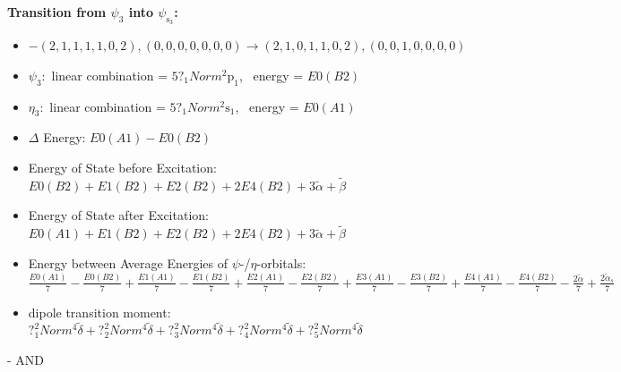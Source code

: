 \documentclass[12pt,a4paper]{article}
\begin{document}
        \noindent\textbf{Transition from $\psi_{3}$ into $\psi_{\text{s}_{3}}$:}
        \begin{itemize}
            \item $- (2, 1, 1, 1, 1, 0, 2), (0, 0, 0, 0, 0, 0, 0) \rightarrow (2, 1, 0, 1, 1, 0, 2), (0, 0, 1, 0, 0, 0, 0)$
        
            \item $\psi_{3}:$ linear combination = $5 ?_{1} Norm^{2} \text{p}_{1}$, \
            energy = $E0(B2)$
            
            \item $\eta_{3}:$ linear combination = $5 ?_{1} Norm^{2} \text{s}_{1}$, \
            energy = $E0(A1)$
            
                \item $\Delta$ Energy: $E0(A1) - E0(B2)$
                \item Energy of State before Excitation: $E0(B2) + E1(B2) + E2(B2) + 2 E4(B2) + 3 \tilde{\alpha} + \tilde{\beta}$
                \item Energy of State after Excitation: $E0(A1) + E1(B2) + E2(B2) + 2 E4(B2) + 3 \tilde{\alpha} + \tilde{\beta}$
                \item Energy between Average Energies of $\psi$-/$\eta$-orbitals: $\frac{E0(A1)}{7} - \frac{E0(B2)}{7} + \frac{E1(A1)}{7} - \frac{E1(B2)}{7} + \frac{E2(A1)}{7} - \frac{E2(B2)}{7} + \frac{E3(A1)}{7} - \frac{E3(B2)}{7} + \frac{E4(A1)}{7} - \frac{E4(B2)}{7} - \frac{2 \tilde{\alpha}}{7} + \frac{2 \tilde{\alpha}_{s}}{7}$
            
            \item dipole transition moment: $?_{1}^{2} Norm^{4} \tilde{\delta} + ?_{2}^{2} Norm^{4} \tilde{\delta} + ?_{3}^{2} Norm^{4} \tilde{\delta} + ?_{4}^{2} Norm^{4} \tilde{\delta} + ?_{5}^{2} Norm^{4} \tilde{\delta}$
        
        \end{itemize}
        
 -  AND 
\end{document}
